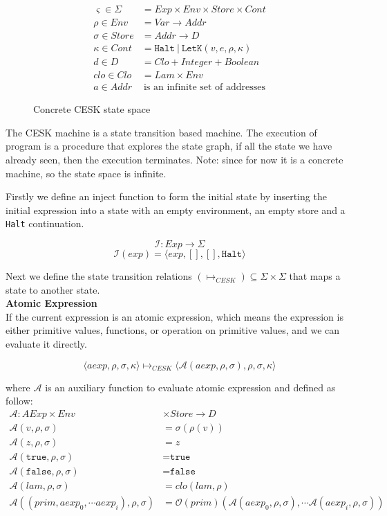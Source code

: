 \documentclass[paper=a4, fontsize=11pt]{scrartcl} %
\numberwithin{equation}{section} %
\numberwithin{figure}{section} %
\numberwithin{table}{section} %
\begin{document}
\begin{figure}[h!]
\begin{align*}
\varsigma \in \Sigma & = Exp \times Env \times Store \times Cont \\
\rho \in Env & = Var \rightarrow Addr \\
\sigma \in Store & = Addr \rightarrow D \\
\kappa \in Cont & = \texttt{Halt} ~|~ \texttt{LetK}(v,e,\rho,\kappa) \\
d \in D & = Clo + Integer + Boolean \\
clo \in Clo & = Lam \times Env \\
a \in Addr & ~ \mbox{is an infinite set of addresses}
\end{align*}
\caption{Concrete CESK state space}
\label{fig:concretecesk}
\end{figure}

The CESK machine is a state transition based machine. The execution of program is a procedure that explores the state graph, if all the state we have already seen, then the execution terminates. Note: since for now it is a concrete machine, so the state space is infinite.

Firstly we define an inject function to form the initial state by inserting the initial expression into a state with an empty environment, an empty store and a \texttt{Halt} continuation.

$$ \mathcal{I} : Exp \rightarrow \Sigma $$
$$ \mathcal{I}(exp) = \langle exp, [], [], \texttt{Halt} \rangle $$

Next we define the state transition relations $(\longmapsto_{CESK}) \subseteq \Sigma \times \Sigma$ that maps a state to another state. \\

\textbf{Atomic Expression}\\
If the current expression is an atomic expression, which means the expression is either primitive values, functions, or operation on primitive values, and we can evaluate it directly.

$$ \langle aexp, \rho, \sigma, \kappa \rangle \longmapsto_{CESK} \langle \mathcal{A}(aexp, \rho, \sigma), \rho, \sigma, \kappa \rangle $$

where $\mathcal{A}$ is an auxiliary function to evaluate atomic expression and defined as follow:
\begin{align*}
\mathcal{A} : AExp \times Env & \times Store \rightarrow D \\
\mathcal{A}(v, \rho, \sigma) & = \sigma(\rho(v)) \\
\mathcal{A}(z, \rho, \sigma) & = z \\
\mathcal{A}(\texttt{true}, \rho, \sigma) & = \texttt{true} \\
\mathcal{A}(\texttt{false}, \rho, \sigma) & = \texttt{false} \\
\mathcal{A}(lam, \rho, \sigma) & = clo(lam, \rho)  \\
\mathcal{A}((prim, aexp_0, \cdots aexp_i), \rho, \sigma) & = \mathcal{O}(prim)(\mathcal{A}(aexp_0, \rho, \sigma), \cdots \mathcal{A}(aexp_i, \rho, \sigma))
\end{align*}
\end{document}
